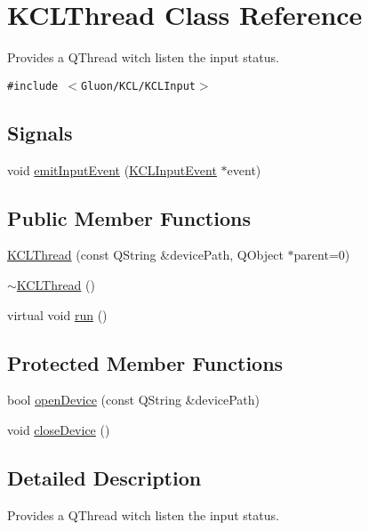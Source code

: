 \hypertarget{class_k_c_l_thread}{
\section{KCLThread Class Reference}
\label{class_k_c_l_thread}
}
Provides a QThread witch listen the input status.  


{\tt \#include $<$Gluon/KCL/KCLInput$>$}

\subsection*{Signals}
\begin{CompactItemize}
\item 
void \hyperlink{class_k_c_l_thread_318807205f19ec5cfbeee2200dbbf995}{emitInputEvent} (\hyperlink{class_k_c_l_input_event}{KCLInputEvent} $\ast$event)
\end{CompactItemize}
\subsection*{Public Member Functions}
\begin{CompactItemize}
\item 
\hyperlink{class_k_c_l_thread_155436758518dcf6eeebc4f1be3e5367}{KCLThread} (const QString \&devicePath, QObject $\ast$parent=0)
\item 
\hyperlink{class_k_c_l_thread_346cf94ab107d40c2b39d41ff5de6f89}{$\sim$KCLThread} ()
\item 
virtual void \hyperlink{class_k_c_l_thread_12a55f25353d1ba81fc237a1c9dc22b5}{run} ()
\end{CompactItemize}
\subsection*{Protected Member Functions}
\begin{CompactItemize}
\item 
bool \hyperlink{class_k_c_l_thread_e3c8ade6ac0c14a7a8961e238fb19794}{openDevice} (const QString \&devicePath)
\item 
void \hyperlink{class_k_c_l_thread_dc58b5a20a35371ecf539c51098411c6}{closeDevice} ()
\end{CompactItemize}


\subsection{Detailed Description}
Provides a QThread witch listen the input status. 

